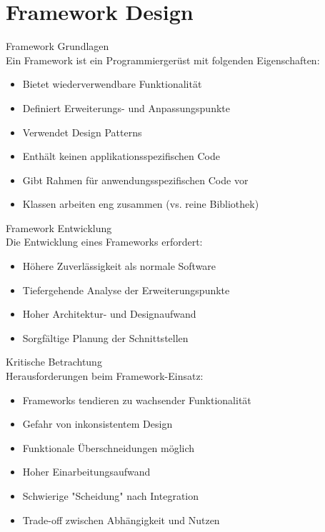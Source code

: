 \section{Framework Design}

\begin{concept}{Framework Grundlagen}\\
Ein Framework ist ein Programmiergerüst mit folgenden Eigenschaften:
\begin{itemize}
    \item Bietet wiederverwendbare Funktionalität
    \item Definiert Erweiterungs- und Anpassungspunkte
    \item Verwendet Design Patterns
    \item Enthält keinen applikationsspezifischen Code
    \item Gibt Rahmen für anwendungsspezifischen Code vor
    \item Klassen arbeiten eng zusammen (vs. reine Bibliothek)
\end{itemize}
\end{concept}

\begin{definition}{Framework Entwicklung}\\
Die Entwicklung eines Frameworks erfordert:
\begin{itemize}
    \item Höhere Zuverlässigkeit als normale Software
    \item Tiefergehende Analyse der Erweiterungspunkte
    \item Hoher Architektur- und Designaufwand
    \item Sorgfältige Planung der Schnittstellen
\end{itemize}
\end{definition}

\begin{remark}{Kritische Betrachtung}\\
Herausforderungen beim Framework-Einsatz:
\begin{itemize}
    \item Frameworks tendieren zu wachsender Funktionalität
    \item Gefahr von inkonsistentem Design
    \item Funktionale Überschneidungen möglich
    \item Hoher Einarbeitungsaufwand
    \item Schwierige "Scheidung" nach Integration
    \item Trade-off zwischen Abhängigkeit und Nutzen
\end{itemize}
\end{remark}

